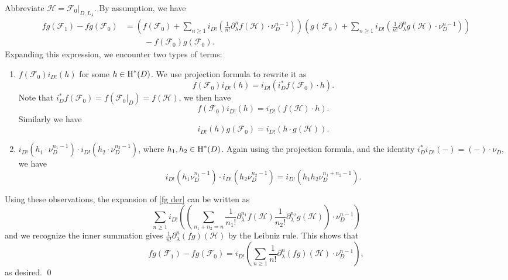 \documentclass[reqno]{amsart}
\numberwithin{equation}{subsection}
\theoremstyle{definition}
\newcommand\cF{\mathcal{F}}
\newcommand\cH{\mathcal{H}}
\newcommand{\cohog}[2]{\textup{H}^{#1}({#2})}     %
\renewcommand{\l}{\lambda}
\newcommand\pl{\partial}
\begin{document}
Abbreviate $\cH=\cF_{0}|_{D, L_{\l}}$. By assumption, we have
\begin{align}\label{fg der}
fg(\cF_{1})-fg(\cF_{0})&=\left(f(\cF_{0})+\sum_{n\ge1}i_{D!}(\frac{1}{n!}\pl_{\l}^{n}f(\cH)\cdot \nu_{D}^{n-1})\right)\left(g(\cF_{0})+\sum_{n\ge1}i_{D!}(\frac{1}{n!}\pl_{\l}^{n}g(\cH)\cdot \nu_{D}^{n-1})\right) \\
&\hspace{1cm} -f(\cF_{0})g(\cF_{0}). \nonumber
\end{align}
Expanding this expression, we encounter two types of terms:
\begin{enumerate}
\item $f(\cF_{0})i_{D!}(h)$ for some $h\in \cohog{*}{D}$. We use projection formula to rewrite it as
\begin{equation*}
f(\cF_{0})i_{D!}(h)=i_{D!}(i_{D}^{*}f(\cF_{0})\cdot h).
\end{equation*}
Note that $i_{D}^{*}f(\cF_{0})=f(\cF_{0}|_{D})=f(\cH)$, we then have
\begin{equation*}
f(\cF_{0})i_{D!}(h)=i_{D!}(f(\cH)\cdot h).
\end{equation*}
Similarly we have
\begin{equation*}
i_{D!}(h)g(\cF_{0})=i_{D!}( h\cdot g(\cH)).
\end{equation*}

\item $i_{D!}(h_{1}\cdot \nu^{n_{1}-1}_{D})\cdot i_{D!}(h_{2} \cdot \nu^{n_{2}-1}_{D})$, where $h_{1},h_{2}\in \cohog{*}{D}$. Again using the projection formula, and the identity $i_{D}^{*}i_{D!}(-)=(-)\cdot \nu_{D}$, we have
\begin{equation*}
i_{D!}(h_{1}\nu^{n_{1}-1}_{D})\cdot i_{D!}(h_{2}\nu^{n_{2}-1}_{D})=i_{D!}(h_{1}h_{2}\nu^{n_{1}+n_{2}-1}_D).
\end{equation*}

\end{enumerate}
Using these observations, the expansion of \eqref{fg der} can be written as
\begin{equation*}
\sum_{n\ge1}i_{D!}\left(\left(\sum_{n_{1}+n_{2}=n}\frac{1}{n_{1}!}\pl_{\l}^{n_{1}}f(\cH)\frac{1}{n_{2}!}\pl_{\l}^{n_{2}}g(\cH)\right)\cdot \nu_{D}^{n-1}\right)
\end{equation*}
and we recognize the inner summation gives $\frac{1}{n!}\pl_{\l}^{n}(fg)(\cH)$ by the Leibniz rule. This shows that 
\[
fg(\cF_1) - fg (\cF_0) = i_{D!} \left( \sum_{n \geq 1} \frac{1}{n!}\pl_{\l}^{n}(fg)(\cH) \cdot \nu_D^{n-1} \right) ,
\]
as desired. \qed
\end{document}
